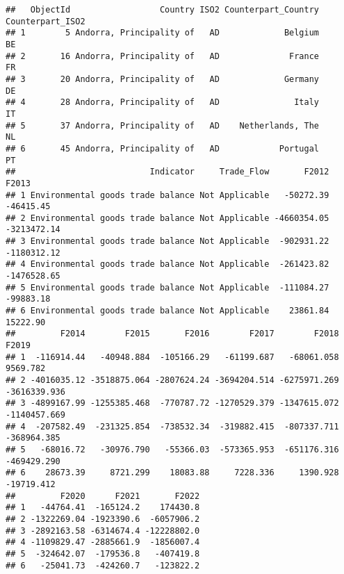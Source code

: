 \documentclass[
]{article}
\begin{document}
\begin{verbatim}
##   ObjectId                  Country ISO2 Counterpart_Country Counterpart_ISO2
## 1        5 Andorra, Principality of   AD             Belgium               BE
## 2       16 Andorra, Principality of   AD              France               FR
## 3       20 Andorra, Principality of   AD             Germany               DE
## 4       28 Andorra, Principality of   AD               Italy               IT
## 5       37 Andorra, Principality of   AD    Netherlands, The               NL
## 6       45 Andorra, Principality of   AD            Portugal               PT
##                           Indicator     Trade_Flow       F2012       F2013
## 1 Environmental goods trade balance Not Applicable   -50272.39   -46415.45
## 2 Environmental goods trade balance Not Applicable -4660354.05 -3213472.14
## 3 Environmental goods trade balance Not Applicable  -902931.22 -1180312.12
## 4 Environmental goods trade balance Not Applicable  -261423.82 -1476528.65
## 5 Environmental goods trade balance Not Applicable  -111084.27   -99883.18
## 6 Environmental goods trade balance Not Applicable    23861.84    15222.90
##         F2014        F2015       F2016        F2017        F2018        F2019
## 1  -116914.44   -40948.884  -105166.29   -61199.687   -68061.058     9569.782
## 2 -4016035.12 -3518875.064 -2807624.24 -3694204.514 -6275971.269 -3616339.936
## 3 -4899167.99 -1255385.468  -770787.72 -1270529.379 -1347615.072 -1140457.669
## 4  -207582.49  -231325.854  -738532.34  -319882.415  -807337.711  -368964.385
## 5   -68016.72   -30976.790   -55366.03  -573365.953  -651176.316  -469429.290
## 6    28673.39     8721.299    18083.88     7228.336     1390.928   -19719.412
##         F2020      F2021       F2022
## 1   -44764.41  -165124.2    174430.8
## 2 -1322269.04 -1923390.6  -6057906.2
## 3 -2892163.58 -6314674.4 -12228802.0
## 4 -1109829.47 -2885661.9  -1856007.4
## 5  -324642.07  -179536.8   -407419.8
## 6   -25041.73  -424260.7   -123822.2
\end{verbatim}
\end{document}
